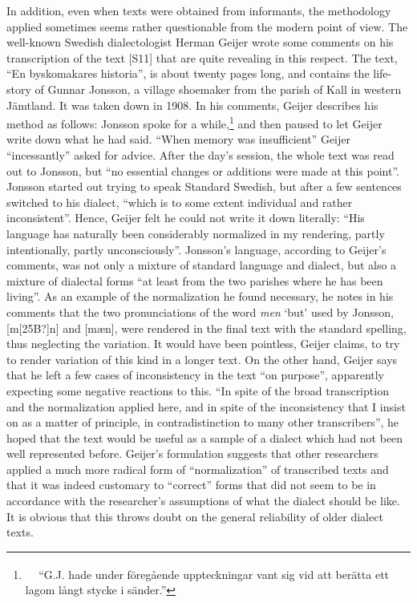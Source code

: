 \begin{styleBodytextC}
In addition, even when texts were obtained from informants, the methodology applied sometimes seems rather questionable from the modern point of view. The well-known Swedish dialectologist Herman Geijer wrote some comments on his transcription of the text [S11] that are quite revealing in this respect. The text, “En byskomakares historia”, is about twenty pages long, and contains the life-story of Gunnar Jonsson, a village shoemaker from the parish of Kall in western Jämtland. It was taken down in 1908. In his comments, Geijer describes his method as follows: Jonsson spoke for a while,\footnote{\textsuperscript{\ \ } “G.J. hade under föregående uppteckningar vant sig vid att berätta ett lagom långt stycke i sänder.”} and then paused to let Geijer write down what he had said. “When memory was insufficient” Geijer “incessantly” asked for advice. After the day’s session, the whole text was read out to Jonsson, but “no essential changes or additions were made at this point”. Jonsson started out trying to speak Standard Swedish, but after a few sentences switched to his dialect, “which is to some extent individual and rather inconsistent”. Hence, Geijer felt he could not write it down literally: “His language has naturally been considerably normalized in my rendering, partly intentionally, partly unconsciously”. Jonsson’s language, according to Geijer’s comments, was not only a mixture of standard language and dialect, but also a mixture of dialectal forms “at least from the two parishes where he has been living”. As an example of the normalization he found necessary, he notes in his comments that the two pronunciations of the word \textit{men} ‘but’ used by Jonsson, [m[25B?]n] and [mæn], were rendered in the final text with the standard spelling, thus neglecting the variation. It would have been pointless, Geijer claims, to try to render variation of this kind in a longer text. On the other hand, Geijer says that he left a few cases of inconsistency in the text “on purpose”, apparently expecting some negative reactions to this. “In spite of the broad transcription and the normalization applied here, and in spite of the inconsistency that I insist on as a matter of principle, in contradistinction to many other transcribers”, he hoped that the text would be useful as a sample of a dialect which had not been well represented before. Geijer’s formulation suggests that other researchers applied a much more radical form of “normalization” of transcribed texts and that it was indeed customary to “correct” forms that did not seem to be in accordance with the researcher’s assumptions of what the dialect should be like. It is obvious that this throws doubt on the general reliability of older dialect texts.

\end{styleBodytextC}

